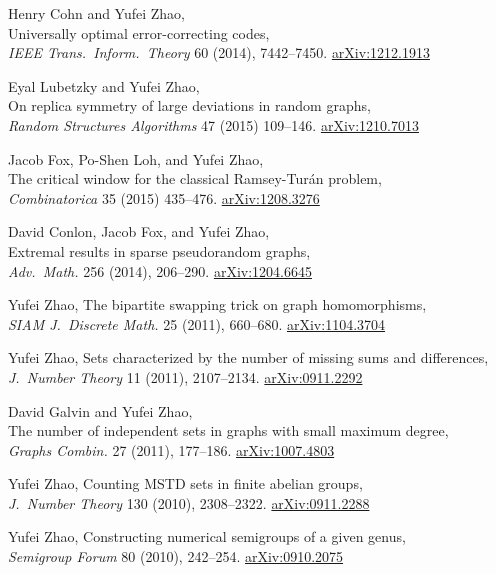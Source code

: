 \documentclass[11pt]{amsart}
\newcommand{\arXiv}[1]{\href{http://arxiv.org/abs/#1}{\color{black!50}\footnotesize\ttfamily  arXiv:#1}}
\renewcommand{\j}[1]{{\frenchspacing\itshape #1}}
\begin{document}
\begin{etaremune}[leftmargin=0.3in,itemsep=4pt,topsep=0pt,partopsep=0pt,parsep=0pt]
\item Henry Cohn and Yufei Zhao, \\
  Universally optimal error-correcting codes, \\
  \j{IEEE Trans.~Inform.~Theory} 60 (2014), 7442--7450.
  \arXiv{1212.1913}

\item Eyal Lubetzky and Yufei Zhao, \\
  On replica symmetry of large deviations in random graphs, \\
  \j{Random Structures Algorithms} 47 (2015) 109--146.
  \arXiv{1210.7013}

\item Jacob Fox, Po-Shen Loh, and Yufei Zhao, \\
  The critical window for the classical Ramsey-Tur\'an problem, \\
  \j{Combinatorica} 35 (2015) 435--476.
  \arXiv{1208.3276}

\item David Conlon, Jacob Fox, and Yufei Zhao, \\
  Extremal results in sparse pseudorandom graphs, \\
  \j{Adv.~Math.} {256} (2014), 206--290.
  \arXiv{1204.6645}

\item Yufei Zhao, 
  {The bipartite swapping trick on graph homomorphisms}, \\
  \j{SIAM J.~Discrete Math.} 25 (2011), 660--680.
  \arXiv{1104.3704}
  
\item Yufei Zhao,
  {Sets characterized by the number of missing sums and differences}, \\
  \j{J.~Number Theory} 11 (2011), 2107--2134.
  \arXiv{0911.2292}

\item David Galvin and Yufei Zhao, \\
  {The number of independent sets in graphs with small maximum degree}, \\
  \j{Graphs Combin.} 27 (2011), 177--186.
  \arXiv{1007.4803}

\item Yufei Zhao,
  {Counting MSTD sets in finite abelian groups}, \\
  \j{J.~Number Theory} {130} (2010), 2308--2322.
  \arXiv{0911.2288}

\item Yufei Zhao,
  {Constructing numerical semigroups of a given genus},\\
  \j{Semigroup Forum} {80} (2010), 242--254.
  \arXiv{0910.2075}
  

\end{etaremune}
\end{document}
